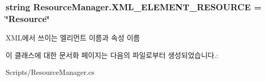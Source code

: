 \subsubsection[{X\+M\+L\+\_\+\+E\+L\+E\+M\+E\+N\+T\+\_\+\+R\+E\+S\+O\+U\+R\+C\+E}]{\setlength{\rightskip}{0pt plus 5cm}string Resource\+Manager.\+X\+M\+L\+\_\+\+E\+L\+E\+M\+E\+N\+T\+\_\+\+R\+E\+S\+O\+U\+R\+C\+E = \char`\"{}Resource\char`\"{}\hspace{0.3cm}{\ttfamily [static]}}\label{class_resource_manager_a1ab2338caffe52ed804c94b05b26a5c1}
X\+M\+L에서 쓰이는 엘리먼트 이름과 속성 이름 

이 클래스에 대한 문서화 페이지는 다음의 파일로부터 생성되었습니다.\+:\begin{DoxyCompactItemize}
\item 
Scripts/Resource\+Manager.\+cs\end{DoxyCompactItemize}
